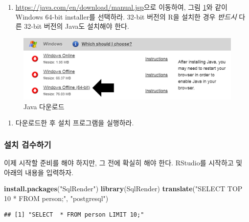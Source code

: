\documentclass[10.5pt]{book}
\newenvironment{Shaded}{\begin{snugshade}}{\end{snugshade}}
\newcommand{\KeywordTok}[1]{\textcolor[rgb]{0.13,0.29,0.53}{\textbf{#1}}}
\newcommand{\StringTok}[1]{\textcolor[rgb]{0.31,0.60,0.02}{#1}}
\newcommand{\NormalTok}[1]{#1}
\providecommand{\tightlist}{%
  \setlength{\itemsep}{0pt}\setlength{\parskip}{0pt}}
\theoremstyle{definition}
\theoremstyle{definition}
\theoremstyle{definition}
\theoremstyle{remark}
\begin{document}
\begin{enumerate}
\def\labelenumi{\arabic{enumi}.}
\tightlist
\item
  \url{https://java.com/en/download/manual.jsp}으로 이동하여, 그림
  \ref{fig:downloadJava}와 같이 Windows 64-bit installer를 선택하라.
  32-bit 버전의 R을 설치한 경우 \emph{반드시} 다른 32-bit 버전의 Java도
  설치해야 한다.
\end{enumerate}

\begin{figure}

{\centering \includegraphics[width=1\linewidth]{images/OhdsiAnalyticsTools/downloadJava} 

}

\caption{Java 다운로드}\label{fig:downloadJava}
\end{figure}

\begin{enumerate}
\def\labelenumi{\arabic{enumi}.}
\setcounter{enumi}{1}
\tightlist
\item
  다운로드한 후 설치 프로그램을 실행하라.
\end{enumerate}

\subsubsection*{설치 검수하기}\label{-}

이제 시작할 준비를 해야 하지만, 그 전에 확실히 해야 한다. RStudio를
시작하고 및 아래의 내용을 입력하자.

\begin{Shaded}
\begin{Highlighting}[]
\KeywordTok{install.packages}\NormalTok{(}\StringTok{"SqlRender"}\NormalTok{)}
\KeywordTok{library}\NormalTok{(SqlRender)}
\KeywordTok{translate}\NormalTok{(}\StringTok{"SELECT TOP 10 * FROM person;"}\NormalTok{, }\StringTok{"postgresql"}\NormalTok{)}
\end{Highlighting}
\end{Shaded}

\begin{verbatim}
## [1] "SELECT  * FROM person LIMIT 10;"
\end{verbatim}
\end{document}
